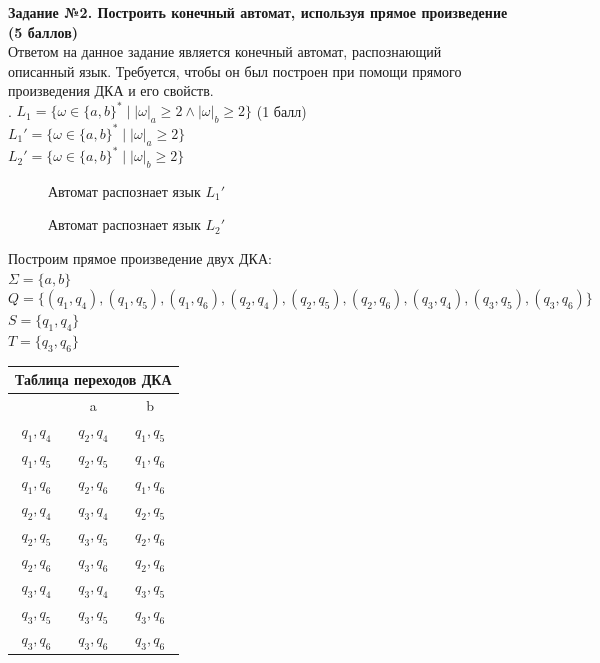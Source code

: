 \documentclass{article}
\begin{document}
\textbf{\Large Задание №2. Построить конечный автомат, используя прямое произведение  (5 баллов)}\\
\hfill \break
\normalsize{Ответом на данное задание является конечный автомат, распознающий описанный язык. Требуется, чтобы он был построен при помощи прямого произведения ДКА и его свойств.}\\
\hfill {}. \(L_1 = \{\omega  \in \{a,b\}^* \mid |\omega|_a \geq 2  \land |\omega|_b \geq 2\}\) (1 балл)\\
\hfill \break
\(L_1' = \{\omega  \in \{a,b\}^* \mid |\omega|_a \geq 2\}\)\\
\(L_2' = \{\omega  \in \{a,b\}^* \mid |\omega|_b \geq 2\}\)\\
\hfill \break
\begin{figure}[h]
\caption{Автомат распознает язык \(L_1'\)}
\end{figure}
\begin{figure}[h]
\caption{Автомат распознает язык \(L_2'\)}
\end{figure}
\hfill \break
\normalsize{Построим прямое произведение двух ДКА:}\\
\(\Sigma = \{a,b\}\)\\
\(Q = \{(q_1,q_4), (q_1,q_5),(q_1,q_6),(q_2,q_4),(q_2,q_5),(q_2,q_6),(q_3,q_4),(q_3,q_5),(q_3,q_6)\}\)\\
\(S = \{q_1,q_4\}\)\\
\(T = \{q_3,q_6\}\)\\
\begin{center}
\begin{tabular} {|c |c |c|}
\hline
\multicolumn{3}{|c|}{Таблица переходов ДКА} \\
\hline
 & a & b \\
\hline
\(q_1,q_4\) & \(q_2,q_4\) & \(q_1,q_5\) \\
\hline
\(q_1,q_5\) & \(q_2,q_5\) & \(q_1,q_6\) \\
\hline
\(q_1,q_6\) & \(q_2,q_6\) & \(q_1,q_6\) \\
\hline
\(q_2,q_4\) & \(q_3,q_4\) & \(q_2,q_5\) \\
\hline
\(q_2,q_5\) & \(q_3,q_5\) & \(q_2,q_6\) \\
\hline
\(q_2,q_6\) & \(q_3,q_6\) & \(q_2,q_6\) \\
\hline
\(q_3,q_4\) & \(q_3,q_4\) & \(q_3,q_5\) \\
\hline
\(q_3,q_5\) & \(q_3,q_5\) & \(q_3,q_6\) \\
\hline
\(q_3,q_6\) & \(q_3,q_6\) & \(q_3,q_6\) \\
\hline
\end{tabular}
\end{center}
\end{document}
